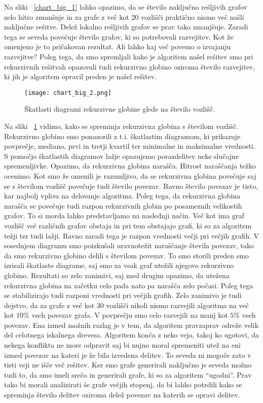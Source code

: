 \documentclass[12pt,a4paper,twoside]{article}
\theoremstyle{definition} %
\theoremstyle{plain} %
\numberwithin{equation}{section}  %
\begin{document}
Na sliki ~\ref{chart_big_1} lahko opazimo, da se število naključno rešljivih grafov zelo hitro zmanšuje in za grafe z več kot $20$ vozlišči praktično nismo več našli naključne rešitve. Delež lokalno rešljivih grafov se prav tako zmanjšuje. Zaradi tega se seveda povečuje število grafov, ki so potrebovali razvejitev.  Kot že omenjeno je to pričakovan rezultat. Ali lahko kaj več povemo o izvajanju razvejitve? Poleg tega, da smo spremljali kako je algoritem našel rešitev smo pri rekurzivnih rešitvah opazovali tudi rekurzivno globino oziroma število razvejitev, ki jih je algoritem opravil preden je našel rešitev. 
 \begin{figure}[h!]
\caption{Škatlasti diagrami rekurzivne globine glede na število vozlišč.}
\label{chart_big_2}
\centering
    \texttt{[image: chart\_big\_2.png]}
    \end{figure}
Na sliki ~\ref{chart_big_2} vidimo, kako se spreminja rekurzivna globina s številom vozlišč. Rekurzivno globino smo ponazorili z t.i. škatlastim diagramom, ki prikazuje povprečje, mediano, prvi in tretji kvartil ter minimalne in maksimalne vrednosti. S pomočjo škatlastih diagramov lažje opazujemo porazdelitev neke slučajne spremenljivke. Opazimo, da rekurzivna globina narašča. Hitrost naraščanja težko ocenimo. Kot smo že omenili je razumljivo, da se rekurzivna globina povečuje saj se s številom vozlišč povečuje tudi število povezav. Ravno število povezav je tisto, kar najbolj vpliva na delovanje algoritma. Poleg tega, da rekurzivna globina narašča se povečuje tudi razpon rekurzivnih globin po posameznih velikostih grafov. To si morda lahko predstavljamo na naslednji način. Več kot ima graf vozlišč več različnih grafov obstaja in pri tem obstajajo grafi, ki so za algoritem težji ter tudi lažji. Ravno zaradi tega je razpon vrednosti večji pri večjih grafih. V sosednjem diagramu smo poizkušali uravnotežit naraščanje števila povezav, tako da smo rekurzivno globino delili s številom povezav. To smo storili preden smo izrisali škatlaste diagrame, saj smo za vsak graf utežili njegovo rekurzivno globino. Rezultati so zelo zanimivi, saj med drugim opazimo, da utežena rekurzivna globina na začetku celo pada nato pa narašča zelo počasi. Poleg tega se stabilizirajo tudi razponi vrednosti pri večjih grafih. Zelo zanimivo je tudi dejstvo, da za grafe z več kot $30$ vozlišči nikoli nismo razvejili algoritma na več kot $10\%$ vseh povezav grafa. V povprečju smo celo razvejili na manj kot $5\%$ vseh povezav. Ena izmed možnih razlag je v tem, da algoritem pravzaprav odreže velik del celotnega iskalnega drevesa. Algoritem konča z neko vejo, takoj ko ugotovi, da nekega konflikta ne more odpravit saj bi nujno moral spremeniti utež na eni izmed povezav na kateri je že bila izvedena delitev. To seveda ni mogoče zato v tisti veji ne išče več rešitev.  Ker smo grafe generirali naključno je seveda možno tudi to, da smo imeli srečo in generirali grafe, ki so za algoritem ``ugodni''. Prav tako bi morali analizirati še grafe večjih stopenj, da bi lahko potrdili kako se spreminja število delitev oziroma delež povezav na katerih se opravi delitev.
\end{document}
